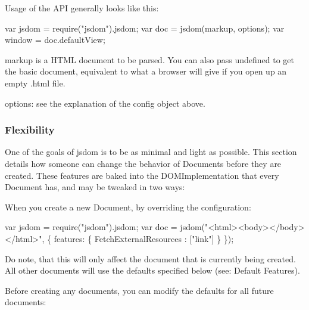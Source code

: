 Usage of the A\+PI generally looks like this\+:


\begin{DoxyCode}
var jsdom = require("jsdom").jsdom;
var doc = jsdom(markup, options);
var window = doc.defaultView;
\end{DoxyCode}



\begin{DoxyItemize}
\item {\ttfamily markup} is a H\+T\+ML document to be parsed. You can also pass {\ttfamily undefined} to get the basic document, equivalent to what a browser will give if you open up an empty {\ttfamily .html} file.
\item {\ttfamily options}\+: see the explanation of the {\ttfamily config} object above.
\end{DoxyItemize}

\subsubsection*{Flexibility}

One of the goals of jsdom is to be as minimal and light as possible. This section details how someone can change the behavior of {\ttfamily Document}s before they are created. These features are baked into the {\ttfamily D\+O\+M\+Implementation} that every {\ttfamily Document} has, and may be tweaked in two ways\+:


\begin{DoxyEnumerate}
\item When you create a new {\ttfamily Document}, by overriding the configuration\+:
\end{DoxyEnumerate}


\begin{DoxyCode}
var jsdom = require("jsdom").jsdom;
var doc = jsdom("<html><body></body></html>", \{
    features: \{
      FetchExternalResources : ["link"]
    \}
\});
\end{DoxyCode}


Do note, that this will only affect the document that is currently being created. All other documents will use the defaults specified below (see\+: Default Features).


\begin{DoxyEnumerate}
\item Before creating any documents, you can modify the defaults for all future documents\+:
\end{DoxyEnumerate}


